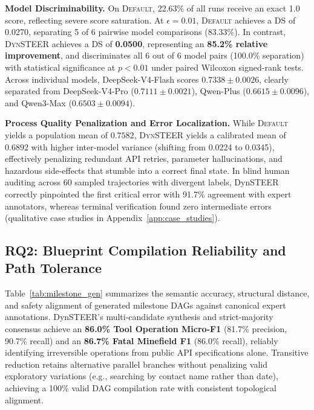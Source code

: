 \textbf{Model Discriminability.} On \textsc{Default}, 22.63\% of all runs receive an exact 1.0 score, reflecting severe score saturation. At $\epsilon = 0.01$, \textsc{Default} achieves a DS of 0.0270, separating 5 of 6 pairwise model comparisons (83.33\%). In contrast, \textsc{DynSTEER} achieves a DS of \textbf{0.0500}, representing an \textbf{85.2\% relative improvement}, and discriminates all 6 out of 6 model pairs (100.0\% separation) with statistical significance at $p < 0.01$ under paired Wilcoxon signed-rank tests. Across individual models, DeepSeek-V4-Flash scores $0.7338 \pm 0.0026$, clearly separated from DeepSeek-V4-Pro ($0.7111 \pm 0.0021$), Qwen-Plus ($0.6615 \pm 0.0096$), and Qwen3-Max ($0.6503 \pm 0.0094$).

\textbf{Process Quality Penalization and Error Localization.} While \textsc{Default} yields a population mean of $0.7582$, \textsc{DynSTEER} yields a calibrated mean of $0.6892$ with higher inter-model variance (shifting from 0.0224 to 0.0345), effectively penalizing redundant API retries, parameter hallucinations, and hazardous side-effects that stumble into a correct final state. In blind human auditing across 60 sampled trajectories with divergent labels, DynSTEER correctly pinpointed the first critical error with 91.7\% agreement with expert annotators, whereas terminal verification found zero intermediate errors (qualitative case studies in Appendix~\ref{app:case_studies}).

\subsection{RQ2: Blueprint Compilation Reliability and Path Tolerance}
\label{sec:exp_rq2}



Table~\ref{tab:milestone_gen} summarizes the semantic accuracy, structural distance, and safety alignment of generated milestone DAGs against canonical expert annotations. DynSTEER's multi-candidate synthesis and strict-majority consensus achieve an \textbf{86.0\% Tool Operation Micro-F1} (81.7\% precision, 90.7\% recall) and an \textbf{86.7\% Fatal Minefield F1} (86.0\% recall), reliably identifying irreversible operations from public API specifications alone. Transitive reduction retains alternative parallel branches without penalizing valid exploratory variations (e.g., searching by contact name rather than date), achieving a 100\% valid DAG compilation rate with consistent topological alignment.

